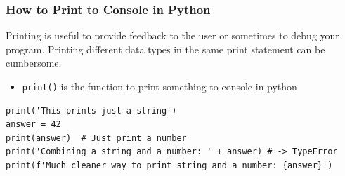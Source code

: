 \documentclass[10pt, a4paper]{beamer} %
\begin{document}
\begin{frame}[c, fragile]\frametitle{How to Print to Console in Python}
  Printing is useful to provide feedback to the user or sometimes to debug your program. Printing different data types
  in the same print statement can be cumbersome.
  \begin{itemize}
    \item \texttt{print()} is the function to print something to console in python
  \end{itemize}

  \begin{lstlisting}
print('This prints just a string') 
answer = 42
print(answer)  # Just print a number
print('Combining a string and a number: ' + answer) # -> TypeError
print(f'Much cleaner way to print string and a number: {answer}')
\end{lstlisting}


\end{frame}
\end{document}
